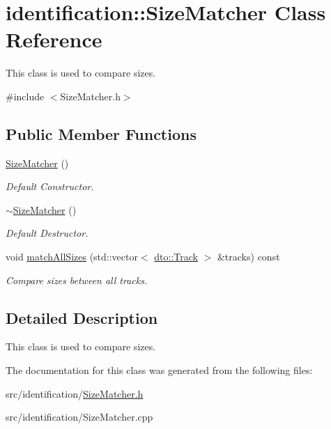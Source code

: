 \hypertarget{classidentification_1_1_size_matcher}{}\section{identification\+:\+:Size\+Matcher Class Reference}
\label{classidentification_1_1_size_matcher}


This class is used to compare sizes.  




{\ttfamily \#include $<$Size\+Matcher.\+h$>$}

\subsection*{Public Member Functions}
\begin{DoxyCompactItemize}
\item 
\mbox{\label{classidentification_1_1_size_matcher_a58ca5437ffee8861a9ad1fcd2286f51b}} 
\mbox{\hyperlink{classidentification_1_1_size_matcher_a58ca5437ffee8861a9ad1fcd2286f51b}{Size\+Matcher}} ()
\begin{DoxyCompactList}\small\item\em Default Constructor. \end{DoxyCompactList}\item 
\mbox{\label{classidentification_1_1_size_matcher_a0942fb0d342f980ff04254604feda21f}} 
\mbox{\hyperlink{classidentification_1_1_size_matcher_a0942fb0d342f980ff04254604feda21f}{$\sim$\+Size\+Matcher}} ()
\begin{DoxyCompactList}\small\item\em Default Destructor. \end{DoxyCompactList}\item 
\mbox{\label{classidentification_1_1_size_matcher_a4c871a5a63e7a6aa05784bb395d7a96c}} 
void \mbox{\hyperlink{classidentification_1_1_size_matcher_a4c871a5a63e7a6aa05784bb395d7a96c}{match\+All\+Sizes}} (std\+::vector$<$ \mbox{\hyperlink{structdto_1_1_track}{dto\+::\+Track}} $>$ \&tracks) const
\begin{DoxyCompactList}\small\item\em Compare sizes between all tracks. \end{DoxyCompactList}\end{DoxyCompactItemize}


\subsection{Detailed Description}
This class is used to compare sizes. 

The documentation for this class was generated from the following files\+:\begin{DoxyCompactItemize}
\item 
src/identification/\mbox{\hyperlink{_size_matcher_8h}{Size\+Matcher.\+h}}\item 
src/identification/Size\+Matcher.\+cpp\end{DoxyCompactItemize}
